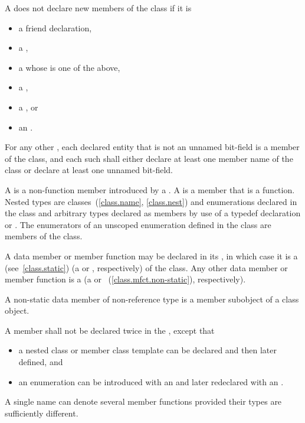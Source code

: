 \pnum
A  does not declare new members of the class
if it is
\begin{itemize}
\item a friend declaration,
\item a ,
\item a  whose  is one of the above,
\item a ,
\item a , or
\item an .
\end{itemize}
For any other ,
each declared entity
that is not an unnamed bit-field
is a member of the class,
and each such 
shall either
declare at least one member name of the class
or declare at least one unnamed bit-field.

\pnum
A  is a non-function member introduced by a
.
A  is a member that is a function.
Nested types are classes~(\ref{class.name}, \ref{class.nest}) and
enumerations declared in the class and arbitrary types
declared as members by use of a typedef declaration
or .
The enumerators of an unscoped enumeration defined in the class
are members of the class.

\pnum
A data member or member function
may be declared  in its ,
in which case it is a  (see~\ref{class.static})
(a  or
, respectively)
of the class.
Any other data member or member function is a 
(a  or
~(\ref{class.mfct.non-static}), respectively).
\begin{note}
A non-static data member of non-reference
type is a member subobject of a class object.
\end{note}

\pnum
A member shall not be declared twice in the
, except that
\begin{itemize}
\item a nested class or member
class template can be declared and then later defined, and
\item an
enumeration can be introduced with an  and later
redeclared with an .
\end{itemize}
\begin{note}
A single name can denote several member functions provided their types
are sufficiently different.
\end{note}

